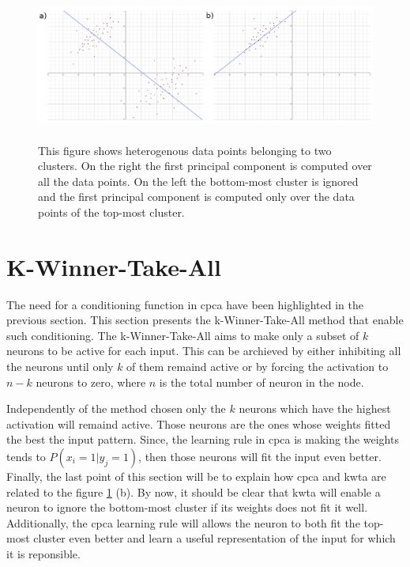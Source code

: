 \documentclass[11pt]{report}
\begin{document}
\begin{figure}[h]
\centering
\includegraphics[width=15cm, height=5cm]{heterogeneous_data}
\caption[Illustration of heterogenous data points belonging to two clusters]{This figure shows heterogenous data points belonging to two clusters. On the right the first principal component is computed over all the data points. On the left the bottom-most cluster is ignored and the first principal component is computed only over the data points of the top-most cluster.}
\label{fig:heterogeneous_data}
\end{figure}

\section{K-Winner-Take-All} \label{sec:kwta}

The need for a conditioning function in \acrshort{cpca} have been highlighted in the previous section. This section presents the k-Winner-Take-All method that enable such conditioning. The k-Winner-Take-All aims to make only a subset of $k$ neurons to be active for each input. This can be archieved by either inhibiting all the neurons until only $k$ of them remaind active or by forcing the activation to $n - k$ neurons to zero, where $n$ is the total number of neuron in the node.\newline

Independently of the method chosen only the $k$ neurons which have the highest activation will remaind active. Those neurons are the ones whose weights fitted the best the input pattern. Since, the learning rule in \acrshort{cpca} is making the weights tends to $P(x_i = 1 | y_j = 1)$, then those neurons will fit the input even better. Finally, the last point of this section will be to explain how \acrshort{cpca} and \acrshort{kwta} are related to the figure \ref{fig:heterogeneous_data} (b). By now, it should be clear that \acrshort{kwta} will enable a neuron to ignore the bottom-most cluster if its weights does not fit it well. Additionally, the \acrshort{cpca} learning rule will allows the neuron to both fit the top-most cluster even better and learn a useful representation of the input for which it is reponsible.
\end{document}
